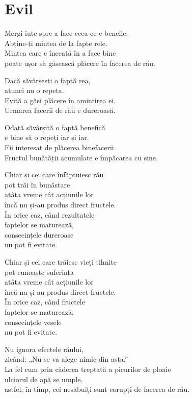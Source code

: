 \chapter{Evil}


Mergi iute spre a face ceea ce e benefic.\\
Abține-ți mintea de la fapte rele.\\
Mintea care e înceată în a face bine\\
poate ușor să găsească plăcere în facerea de rău.


Dacă săvârșești o faptă rea,\\
atunci nu o repeta.\\
Evită a găsi plăcere în amintirea ei.\\
Urmarea facerii de rău e dureroasă.


Odată săvârșită o faptă benefică\\
e bine să o repeți iar și iar.\\
Fii interesat de plăcerea binefacerii.\\
Fructul bunătății acumulate e împăcarea cu sine.


Chiar și cei care înfăptuiesc rău\\
pot trăi în bunăstare\\
atâta vreme cât acțiunile lor\\
încă nu și-au produs direct fructele.\\
În orice caz, când rezultatele\\
faptelor se maturează,\\
consecințele dureroase\\
nu pot fi evitate.


Chiar și cei care trăiesc vieți tihnite\\
pot cunoaște suferința\\
atâta vreme cât acțiunile lor\\
încă nu și-au produs direct fructele.\\
În orice caz, când fructele\\
faptelor se maturează,\\
consecințele vesele\\
nu pot fi evitate.


Nu ignora efectele răului,\\
zicând: „Nu se va alege nimic din asta.”\\
La fel cum prin căderea treptată a picurilor de ploaie\\
ulciorul de apă se umple,\\
astfel, în timp, cei nesăbuiți sunt corupți de facerea de rău.

